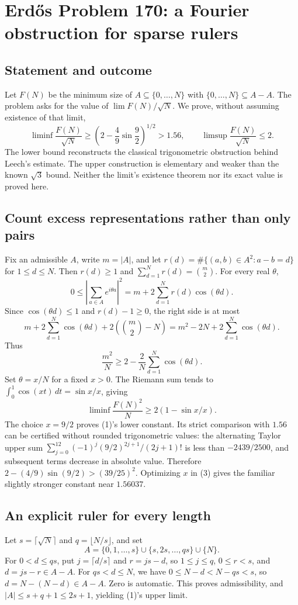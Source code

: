 \section*{Erd\H{o}s Problem 170: a Fourier obstruction for sparse rulers}
\subsection*{Statement and outcome}
Let $F(N)$ be the minimum size of $A\subseteq\{0,\ldots,N\}$ with
$\{0,\ldots,N\}\subseteq A-A$. The problem asks for the value of
$\lim F(N)/\sqrt N$. We prove, without assuming existence of that limit,
\[
 \liminf\frac{F(N)}{\sqrt N}
 \ge\left(2-\frac49\sin\frac92\right)^{1/2}>1.56,
 \qquad
 \limsup\frac{F(N)}{\sqrt N}\le2.
 \tag{1}
\]
The lower bound reconstructs the classical trigonometric obstruction behind Leech's estimate. The upper construction is elementary and weaker than the known $\sqrt3$ bound. Neither the limit's existence theorem nor its exact value is proved here.

\subsection*{Count excess representations rather than only pairs}
Fix an admissible $A$, write $m=|A|$, and let
$r(d)=\#\{(a,b)\in A^2:a-b=d\}$ for $1\le d\le N$.
Then $r(d)\ge1$ and
$\sum_{d=1}^Nr(d)=\binom m2$.
For every real $\theta$,
\[
 0\le\left|\sum_{a\in A}e^{i\theta a}\right|^2
 =m+2\sum_{d=1}^Nr(d)\cos(\theta d).
\]
Since $\cos(\theta d)\le1$ and $r(d)-1\ge0$, the right side is at most
\[
 m+2\sum_{d=1}^N\cos(\theta d)
 +2\left(\binom m2-N\right)
 =m^2-2N+2\sum_{d=1}^N\cos(\theta d).
\]
Thus
\[
 \frac{m^2}{N}\ge
 2-\frac2N\sum_{d=1}^N\cos(\theta d).
 \tag{2}
\]
Set $\theta=x/N$ for a fixed $x>0$. The Riemann sum tends to
$\int_0^1\cos(xt)\,dt=\sin x/x$, giving
\[
 \liminf\frac{F(N)^2}{N}\ge 2(1-\sin x/x).
 \tag{3}
\]
The choice $x=9/2$ proves (1)'s lower constant. Its strict comparison with $1.56$ can be certified without rounded trigonometric values: the alternating Taylor upper sum
$\sum_{j=0}^{12}(-1)^j(9/2)^{2j+1}/(2j+1)!$
is less than $-2439/2500$, and subsequent terms decrease in absolute value. Therefore
$2-(4/9)\sin(9/2)>(39/25)^2$.
Optimizing $x$ in (3) gives the familiar slightly stronger constant near $1.56037$.

\subsection*{An explicit ruler for every length}
Let $s=\lceil\sqrt N\rceil$ and $q=\lfloor N/s\rfloor$, and set
\[
 A=\{0,1,\ldots,s\}\cup\{s,2s,\ldots,qs\}\cup\{N\}.
\]
For $0<d\le qs$, put $j=\lceil d/s\rceil$ and $r=js-d$, so
$1\le j\le q$, $0\le r<s$, and $d=js-r\in A-A$.
For $qs<d\le N$, we have $0\le N-d<N-qs<s$, so
$d=N-(N-d)\in A-A$. Zero is automatic. This proves admissibility, and
$|A|\le s+q+1\le2s+1$, yielding (1)'s upper limit.

